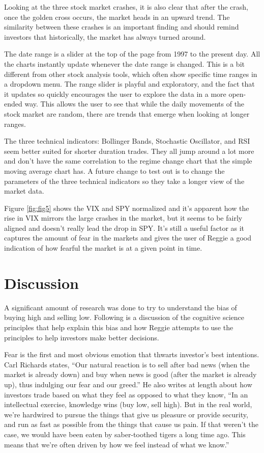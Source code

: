 \documentclass[conference]{IEEEtran}
\begin{document}
Looking at the three stock market crashes, it is also clear that after the crash, once the golden cross occurs, the market heads in an upward trend. The similarity between these crashes is an important finding and should remind investors that historically, the market has always turned around. 

The date range is a slider at the top of the page from 1997 to the present day. All the charts instantly update whenever the date range is changed. This is a bit different from other stock analysis tools, which often show specific time ranges in a dropdown menu. The range slider is playful and exploratory, and the fact that it updates so quickly encourages the user to explore the data in a more open-ended way. This allows the user to see that while the daily movements of the stock market are random, there are trends that emerge when looking at longer ranges.

The three technical indicators: Bollinger Bands, Stochastic Oscillator, and RSI seem better suited for shorter duration trades. They all jump around a lot more and don't have the same correlation to the regime change chart that the simple moving average chart has. A future change to test out is to change the parameters of the three technical indicators so they take a longer view of the market data. 

Figure \ref{fig:fig5} shows the VIX and SPY normalized and it's apparent how the rise in VIX mirrors the large crashes in the market, but it seems to be fairly aligned and doesn't really lead the drop in SPY. It's still a useful factor as it captures the amount of fear in the markets and gives the user of Reggie a good indication of how fearful the market is at a given point in time.

\section{Discussion}

A significant amount of research was done to try to understand the bias of buying high and selling low. Following is a discussion of the cognitive science principles that help explain this bias and how Reggie attempts to use the principles to help investors make better decisions. 

Fear is the first and most obvious emotion that thwarts investor's best intentions. Carl Richards states, ``Our natural reaction is to sell after bad news (when the market is already down) and buy when news is good (after the market is already up), thus indulging our fear and our greed.'' \cite{b4} He also writes at length about how investors trade based on what they feel as opposed to what they know, ``In an intellectual exercise, knowledge wins (buy low, sell high\!). But in the real world, we're hardwired to pursue the things that give us pleasure or provide security, and run as fast as possible from the things that cause us pain. If that weren't the case, we would have been eaten by saber-toothed tigers a long time ago. This means that we're often driven by how we feel instead of what we know.'' \cite{b4} 
\end{document}
